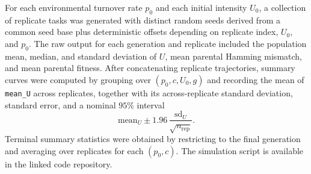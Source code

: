 {For each environmental turnover rate $p_0$ and each initial intensity $U_0$, a collection of replicate tasks was generated with distinct random seeds derived from a common seed base plus deterministic offsets depending on replicate index, $U_0$, and $p_0$. The raw output for each generation and replicate included the population mean, median, and standard deviation of $U$, mean parental Hamming mismatch, and mean parental fitness. After concatenating replicate trajectories, summary curves were computed by grouping over $(p_0,c,U_0,g)$ and recording the mean of \texttt{mean\_U} across replicates, together with its across-replicate standard deviation, standard error, and a nominal $95\%$ interval
\[
\mathrm{mean}_U \pm 1.96 \,\frac{\mathrm{sd}_U}{\sqrt{n_{\mathrm{rep}}}}.
\]
Terminal summary statistics were obtained by restricting to the final generation and averaging over replicates for each $(p_0,c)$. The simulation script is available in the linked code repository. %
}
 
